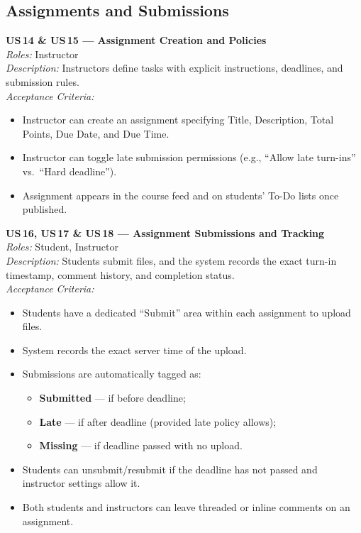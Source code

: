 \documentclass[11pt, legalpaper]{article}
\begin{document}
\subsection{Assignments and Submissions}

\begin{userstory}
  \textbf{US\,14 \& US\,15 — Assignment Creation and Policies}\\[4pt]
  \textit{Roles:} Instructor\\[2pt]
  \textit{Description:} Instructors define tasks with explicit instructions,
  deadlines, and submission rules.\\[4pt]
  \textit{Acceptance Criteria:}
  \begin{itemize}
    \item Instructor can create an assignment specifying Title, Description,
          Total Points, Due Date, and Due Time.
    \item Instructor can toggle late submission permissions (e.g., ``Allow
          late turn-ins'' vs.\ ``Hard deadline'').
    \item Assignment appears in the course feed and on students' To-Do lists
          once published.
  \end{itemize}
\end{userstory}

\begin{userstory}
  \textbf{US\,16, US\,17 \& US\,18 — Assignment Submissions and Tracking}\\[4pt]
  \textit{Roles:} Student, Instructor\\[2pt]
  \textit{Description:} Students submit files, and the system records the
  exact turn-in timestamp, comment history, and completion status.\\[4pt]
  \textit{Acceptance Criteria:}
  \begin{itemize}
    \item Students have a dedicated ``Submit'' area within each assignment to
          upload files.
    \item System records the exact server time of the upload.
    \item Submissions are automatically tagged as:\
      \begin{itemize}
        \item \textbf{Submitted} — if before deadline;
        \item \textbf{Late} — if after deadline (provided late policy allows);
        \item \textbf{Missing} — if deadline passed with no upload.
      \end{itemize}
    \item Students can unsubmit/resubmit if the deadline has not passed and
          instructor settings allow it.
    \item Both students and instructors can leave threaded or inline comments
          on an assignment.
  \end{itemize}
\end{userstory}
\end{document}
